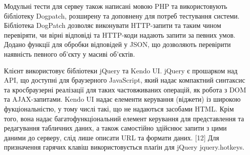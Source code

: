 Модульні тести для сервеу також написані мовою PHP та використовують бібліотеку Dogpatch, розширену та доповнену для потреб тестування системи. Бібліотека DogPatch дозволяє виконувати HTTP-запити та таким чином перевіряти, чи вірні відповіді та HTTP-коди надають запити за певних умов. Додано функції для обробки відповідей у JSON, що дозволяють перевірити наявність певного об'єкту у масиві об'єктів.

Клієнт використовує бібліотеки jQuery та Kendo UI. jQuery є прошарком над API, що доступні для браузерного JavaScript, який надає компактний синтаксис та кросбраузерні реалізації для таких частовживаних операцій, як робота з DOM та AJAX-запитами. Kendo UI надає елементи керування (віджети) із широкою фукціональністю, у тому числі такі, що не надаються засобами HTML. Крім того, вона надає багатофункціональний елемент керування для представлення та редагування табличних даних, а також самостійно здійснює запити з цими даними до серверу, слід лише описати URL та формати даних. [12] Для призначення гарячих клавіш використовується плаґін для jQuery jquery.hotkeys.
\bigbreak
